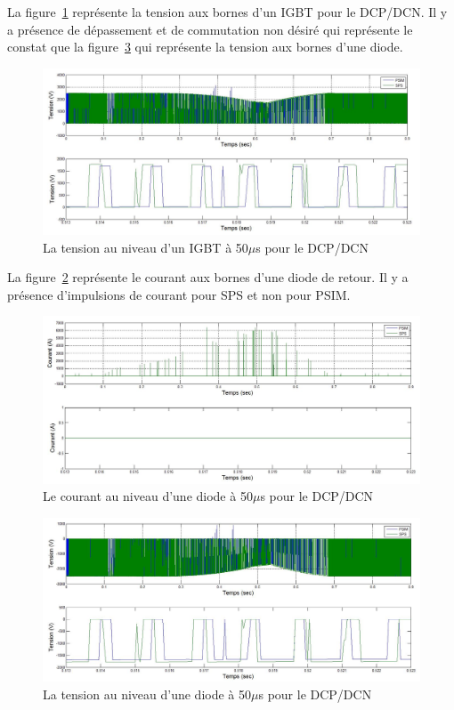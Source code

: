 \documentclass[11pt,letterpaper,final]{report}
\begin{document}
La figure~\ref{AF_DC_HAV50} représente la tension aux bornes d'un IGBT pour le DCP/DCN. Il y a présence de dépassement et de commutation non désiré qui représente le constat que la figure~\ref{AF_DC_HV50} qui représente la tension aux bornes d'une diode.

\begin{figure}[htb]
\centering
\includegraphics[scale=0.5]{Fig/DCP_AFE/50u/hash_ten_IGBT.jpg}
\caption{La tension au niveau d'un IGBT à 50$\mu$s pour le DCP/DCN}
\label{AF_DC_HAV50}
\end{figure}
La figure~\ref{AF_DC_HA50} représente le courant aux bornes d'une diode de retour. Il y a présence d'impulsions de courant pour SPS et non pour PSIM.

\begin{figure}[htb]
\centering
\includegraphics[scale=0.5]{Fig/DCP_AFE/50u/hash_diode_cou.jpg}
\caption{Le courant au niveau d'une diode à 50$\mu$s pour le DCP/DCN}
\label{AF_DC_HA50}
\end{figure}


\begin{figure}[htb]
\centering
\includegraphics[scale=0.5]{Fig/DCP_AFE/50u/hash_diode.jpg}
\caption{La tension au niveau d'une diode à 50$\mu$s pour le DCP/DCN}
\label{AF_DC_HV50}
\end{figure}
\end{document}
